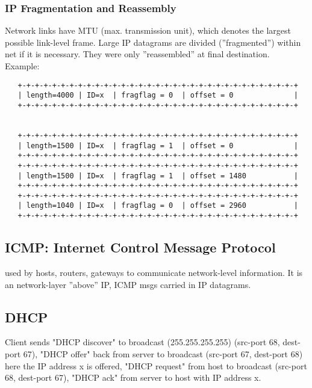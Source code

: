 \documentclass[10pt, a4paper, twocolumn]{scrartcl}
\begin{document}
\subsubsection{IP Fragmentation and Reassembly}

Network links have MTU (max. transmission unit), which denotes the largest possible link-level frame. Large IP datagrams are divided (''fragmented'') within net if it is necessary. They were only ''reassembled'' at final destination.\\

Example: 
\scriptsize
\begin{verbatim}
   +-+-+-+-+-+-+-+-+-+-+-+-+-+-+-+-+-+-+-+-+-+-+-+-+-+-+-+-+-+-+-+-+
   | length=4000 | ID=x  | fragflag = 0  | offset = 0              |
   +-+-+-+-+-+-+-+-+-+-+-+-+-+-+-+-+-+-+-+-+-+-+-+-+-+-+-+-+-+-+-+-+

   
   +-+-+-+-+-+-+-+-+-+-+-+-+-+-+-+-+-+-+-+-+-+-+-+-+-+-+-+-+-+-+-+-+
   | length=1500 | ID=x  | fragflag = 1  | offset = 0              |
   +-+-+-+-+-+-+-+-+-+-+-+-+-+-+-+-+-+-+-+-+-+-+-+-+-+-+-+-+-+-+-+-+
   +-+-+-+-+-+-+-+-+-+-+-+-+-+-+-+-+-+-+-+-+-+-+-+-+-+-+-+-+-+-+-+-+
   | length=1500 | ID=x  | fragflag = 1  | offset = 1480           |
   +-+-+-+-+-+-+-+-+-+-+-+-+-+-+-+-+-+-+-+-+-+-+-+-+-+-+-+-+-+-+-+-+
   +-+-+-+-+-+-+-+-+-+-+-+-+-+-+-+-+-+-+-+-+-+-+-+-+-+-+-+-+-+-+-+-+
   | length=1040 | ID=x  | fragflag = 0  | offset = 2960           |
   +-+-+-+-+-+-+-+-+-+-+-+-+-+-+-+-+-+-+-+-+-+-+-+-+-+-+-+-+-+-+-+-+
\end{verbatim}
\normalsize

\subsection{ICMP: Internet Control Message Protocol}

used by hosts, routers, gateways to communicate network-level information. It is an network-layer ''above'' IP, ICMP msgs carried in IP datagrams.

\subsection{DHCP}

Client sends "DHCP discover" to broadcast (255.255.255.255) (src-port 68, dest-port 67), "DHCP offer" back from server to broadcast (src-port 67, dest-port 68) here the IP address x is offered, "DHCP request" from host to broadcast (src-port 68, dest-port 67), "DHCP ack" from server to host with IP address x.
\end{document}
